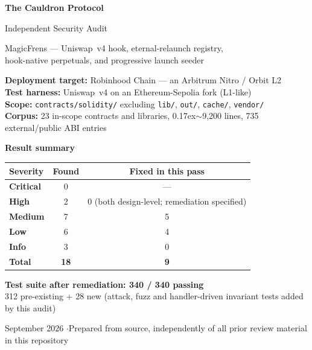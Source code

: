 \documentclass[11pt,a4paper]{article}
\newcommand{\SevCrit}{\textcolor{critical}{\textbf{Critical}}}
\newcommand{\SevHigh}{\textcolor{high}{\textbf{High}}}
\newcommand{\SevMed}{\textcolor{medium}{\textbf{Medium}}}
\newcommand{\SevLow}{\textcolor{low}{\textbf{Low}}}
\newcommand{\SevInfo}{\textcolor{info}{\textbf{Info}}}
\newcommand{\code}[1]{\texttt{\small #1}}
\begin{document}
\begin{titlepage}
\centering
\vspace*{2.2cm}
{\Huge\bfseries\color{ink} The Cauldron Protocol\par}
\vspace{0.5cm}
{\LARGE\color{slate} Independent Security Audit\par}
\vspace{0.3cm}
{\large\color{slate} MagicFrens --- Uniswap~v4 hook, eternal-relaunch registry,\\
hook-native perpetuals, and progressive launch seeder\par}

\vspace{1.6cm}
\begin{tcolorbox}[width=0.86\linewidth,colback=panel,colframe=rule,boxrule=0.8pt,arc=2pt]
\centering\small
\textbf{Deployment target:} Robinhood Chain --- an Arbitrum Nitro / Orbit L2\\[3pt]
\textbf{Test harness:} Uniswap~v4 on an Ethereum-Sepolia fork (L1-like)\\[3pt]
\textbf{Scope:} \code{contracts/solidity/} excluding \code{lib/}, \code{out/}, \code{cache/}, \code{vendor/}\\[3pt]
\textbf{Corpus:} 23 in-scope contracts and libraries, {\raise0.17ex\hbox{$\scriptstyle\sim$}}9{,}200 lines,
735 external/public ABI entries
\end{tcolorbox}

\vspace{1.2cm}
{\large\bfseries Result summary\par}
\vspace{0.35cm}
\begin{tabular}{@{}lcc@{}}
\toprule
\textbf{Severity} & \textbf{Found} & \textbf{Fixed in this pass} \\
\midrule
\SevCrit  & 0 & --- \\
\SevHigh  & 2 & 0 (both design-level; remediation specified) \\
\SevMed   & 7 & 5 \\
\SevLow   & 6 & 4 \\
\SevInfo  & 3 & 0 \\
\midrule
\textbf{Total} & \textbf{18} & \textbf{9} \\
\bottomrule
\end{tabular}

\vspace{0.9cm}
{\small\color{good}\textbf{Test suite after remediation: 340 / 340 passing}}\\[2pt]
{\scriptsize\color{slate} 312 pre-existing + 28 new (attack, fuzz and handler-driven invariant tests added by this audit)}

\vfill
{\small\color{slate} September 2026 \quad$\cdot$\quad Prepared from source, independently of all prior review material in this repository}
\end{titlepage}
\end{document}

